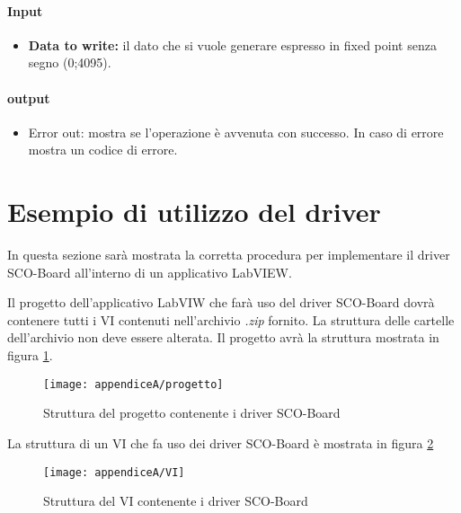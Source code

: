\paragraph{Input}
\begin{itemize}
	\item \textbf{Data to write:} il dato che si vuole generare espresso in fixed point senza segno (0;4095).
\end{itemize}

\paragraph{output}
\begin{itemize}
	\item Error out: mostra se l'operazione è avvenuta con successo. In caso di errore mostra un codice di errore.
\end{itemize}

\section{Esempio di utilizzo del driver}
In questa sezione sarà mostrata la corretta procedura per implementare il driver SCO-Board all'interno di un applicativo LabVIEW.

Il progetto dell'applicativo LabVIW che farà uso del driver SCO-Board dovrà contenere tutti i VI contenuti nell'archivio \textit{.zip} fornito. La struttura delle cartelle dell'archivio non deve essere alterata.
Il progetto avrà la struttura mostrata in figura \ref{progetto}.

\begin{figure}[H]
	\begin{center}
		\texttt{[image: appendiceA/progetto]}
		\caption{Struttura del progetto contenente i driver SCO-Board}
		\label{progetto}
	\end{center}
\end{figure}

La struttura di un VI che fa uso dei driver SCO-Board è mostrata in figura \ref{VI}

\begin{figure}[H]
	\begin{center}
		\texttt{[image: appendiceA/VI]}
		\caption{Struttura del VI contenente i driver SCO-Board}
		\label{VI}
	\end{center}
\end{figure}

